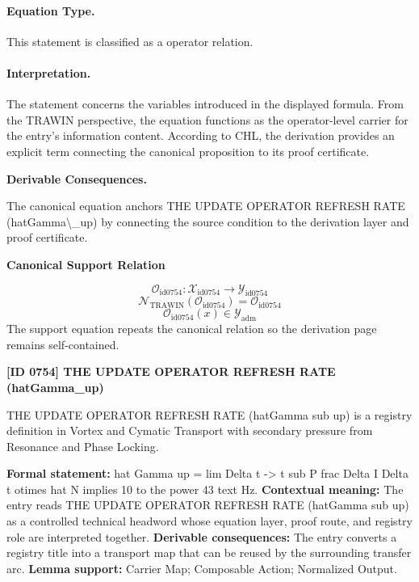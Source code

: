 \paragraph{Equation Type.}
This statement is classified as a operator relation.

\paragraph{Interpretation.}
The statement concerns the variables introduced in the displayed formula. From the TRAWIN perspective, the equation functions as the operator-level carrier for the entry’s information content. According to CHL, the derivation provides an explicit term connecting the canonical proposition to its proof certificate.

\par\vspace{0.35em}
\noindent\textbf{Derivable Consequences.}\quad
\begingroup
\footnotesize
\raggedright
The canonical equation anchors THE UPDATE OPERATOR REFRESH RATE (hatGamma\textbackslash{}\_up) by connecting the source condition to the derivation layer and proof certificate.
\par\endgroup

\noindent\textbf{Canonical Support Relation}\par
\[
\mathcal{O}_{\mathrm{id0754}}:\mathcal{X}_{\mathrm{id0754}}\longrightarrow\mathcal{Y}_{\mathrm{id0754}}
\]
\[
\mathcal{N}_{\mathrm{TRAWIN}}(\mathcal{O}_{\mathrm{id0754}})=\mathcal{O}_{\mathrm{id0754}}
\]
\[
\mathcal{O}_{\mathrm{id0754}}(x)\in\mathcal{Y}_{\mathrm{adm}}
\]
\noindent The support equation repeats the canonical relation so the derivation page remains self-contained.\par

\clearpage
\noindent\textbf{[ID 0754] THE UPDATE OPERATOR REFRESH RATE (hatGamma\_up)}\par
\vspace{0.35em}
\begingroup\small
{}
THE UPDATE OPERATOR REFRESH RATE (hatGamma sub up) is a registry definition in Vortex and Cymatic Transport with secondary pressure from Resonance and Phase Locking.

\begingroup\footnotesize\setlength{\emergencystretch}{3em}\sloppy
\textbf{Formal statement:} hat Gamma up = lim Delta t -> t sub P frac Delta I Delta t otimes hat N implies 10 to the power 43 text Hz. \textbf{Contextual meaning:} The entry reads THE UPDATE OPERATOR REFRESH RATE (hatGamma sub up) as a controlled technical headword whose equation layer, proof route, and registry role are interpreted together. \textbf{Derivable consequences:} The entry converts a registry title into a transport map that can be reused by the surrounding transfer arc. \textbf{Lemma support:} Carrier Map; Composable Action; Normalized Output.\par
\endgroup


